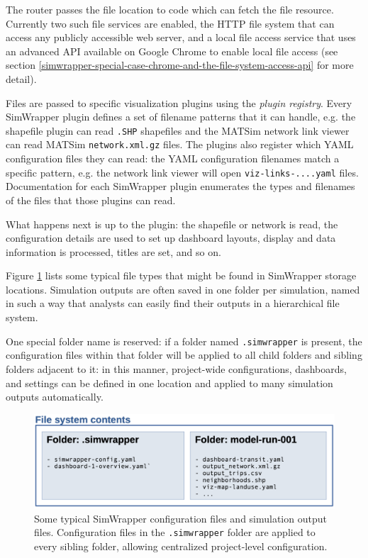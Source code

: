 The router passes the file location to code which can fetch the file resource. Currently two such file services are enabled, the HTTP file system that can access any publicly accessible web server, and a local file access service that uses an advanced API available on Google Chrome to enable local file access (see section \ref{simwrapper-special-case-chrome-and-the-file-system-access-api} for more detail).

Files are passed to specific visualization plugins using the \emph{plugin registry}. Every SimWrapper plugin defines a set of filename patterns that it can handle, e.g. the shapefile plugin can read \texttt{.SHP} shapefiles and the MATSim network link viewer can read MATSim \texttt{network.xml.gz} files. The plugins also register which YAML configuration files they can read: the YAML configuration filenames match a specific pattern, e.g. the network link viewer will open \texttt{viz-links-....yaml} files. Documentation for each SimWrapper plugin enumerates the types and filenames of the files that those plugins can read.

What happens next is up to the plugin: the shapefile or network is read, the configuration details are used to set up dashboard layouts, display and data information is processed, titles are set, and so on.

Figure \ref{fig:simwrapper-flowchart-2} lists some typical file types that might be found in SimWrapper storage locations. Simulation outputs are often saved in one folder per simulation, named in such a way that analysts can easily find their outputs in a hierarchical file system.

One special folder name is reserved: if a folder named \texttt{.simwrapper} is present, the configuration files within that folder will be applied to all child folders and sibling folders adjacent to it: in this manner, project-wide configurations, dashboards, and settings can be defined in one location and applied to many simulation outputs automatically.

\begin{figure}[ht]
  \centering
  \includegraphics[width=0.95\linewidth]{chapters/31-simwrapper/images/flowchart-2.png}
  \caption{Some typical SimWrapper configuration files and simulation output files. Configuration files in the \texttt{.simwrapper} folder are applied to every sibling folder, allowing centralized project-level configuration.}
  \label{fig:simwrapper-flowchart-2}
\end{figure}


